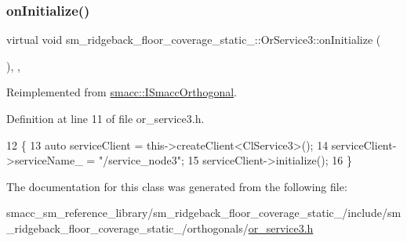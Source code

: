 \subsubsection{\texorpdfstring{on\+Initialize()}{onInitialize()}}
{\footnotesize\ttfamily virtual void sm\+\_\+ridgeback\+\_\+floor\+\_\+coverage\+\_\+static\+\_\+::\+Or\+Service3\+::on\+Initialize (\begin{DoxyParamCaption}{ }\end{DoxyParamCaption})\hspace{0.3cm}{\ttfamily [inline]}, {\ttfamily [override]}, {\ttfamily [virtual]}}



Reimplemented from \hyperlink{classsmacc_1_1ISmaccOrthogonal_a6bb31c620cb64dd7b8417f8705c79c7a}{smacc\+::\+I\+Smacc\+Orthogonal}.



Definition at line 11 of file or\+\_\+service3.\+h.


\begin{DoxyCode}
12     \{
13         \textcolor{keyword}{auto} serviceClient = this->createClient<ClService3>();
14         serviceClient->serviceName\_ = \textcolor{stringliteral}{"/service\_node3"};
15         serviceClient->initialize();
16     \}
\end{DoxyCode}


The documentation for this class was generated from the following file\+:\begin{DoxyCompactItemize}
\item 
smacc\+\_\+sm\+\_\+reference\+\_\+library/sm\+\_\+ridgeback\+\_\+floor\+\_\+coverage\+\_\+static\+\_/include/sm\+\_\+ridgeback\+\_\+floor\+\_\+coverage\+\_\+static\+\_/orthogonals/\hyperlink{sm__ridgeback__floor__coverage__static__1_2include_2sm__ridgeback__floor__coverage__static__1_2orthogonals_2or__service3_8h}{or\+\_\+service3.\+h}\end{DoxyCompactItemize}
